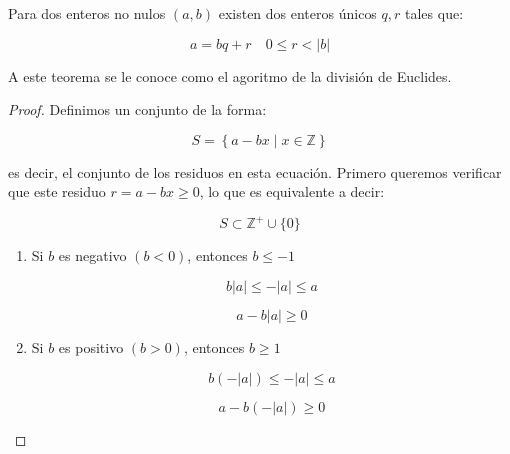         \begin{teorema}
            Para dos enteros no nulos $(a, b)$ existen dos enteros únicos $q, r$ tales que:

            \begin{equation}
                a = bq + r \quad 0 \leq r < |b|
            \end{equation}

            A este teorema se le conoce como el agoritmo de la división de Euclides.
        \end{teorema}

        \begin{proof}
            Definimos un conjunto de la forma:

            \begin{equation}
                S = \left\{ a - bx \mid x \in \mathbb{Z} \right\}
            \end{equation}

            es decir, el conjunto de los residuos en esta ecuación. Primero queremos verificar que este residuo $r = a - bx \geq 0$, lo que es equivalente a decir:

            \begin{equation*}
                S \subset \mathbb{Z}^+ \cup \{0\}
            \end{equation*}

            \begin{enumerate}
                \item Si $b$ es negativo $(b < 0)$, entonces $b \leq -1$

                \begin{equation*}
                    b|a| \leq - |a| \leq a
                \end{equation*}

                \begin{equation*}
                    a - b|a| \geq 0
                \end{equation*}

                \item Si $b$ es positivo $(b > 0)$, entonces $b \geq 1$

                \begin{equation*}
                    b(-|a|) \leq -|a| \leq a
                \end{equation*}

                \begin{equation*}
                    a - b(-|a|) \geq 0
                \end{equation*}
            \end{enumerate}


\end{proof}
